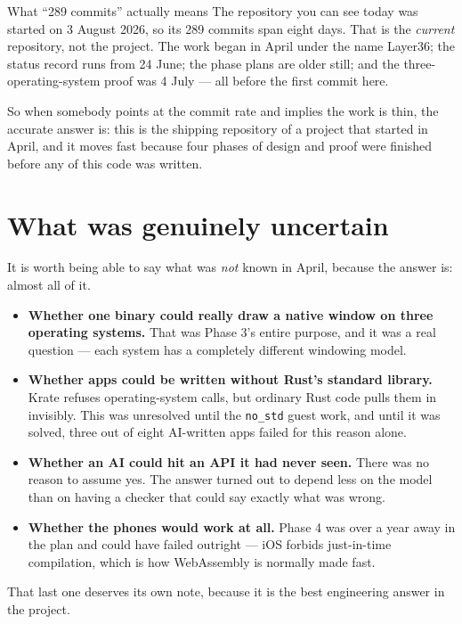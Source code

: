 \documentclass[11pt,a4paper]{report}
\begin{document}
\begin{plainbox}{What ``289 commits'' actually means}
The repository you can see today was started on 3 August 2026, so its
289 commits span eight days. That is the \emph{current} repository, not the
project. The work began in April under the name Layer36; the status record
runs from 24 June; the phase plans are older still; and the
three-operating-system proof was 4 July --- all before the first commit
here.

So when somebody points at the commit rate and implies the work is thin,
the accurate answer is: this is the shipping repository of a project that
started in April, and it moves fast because four phases of design and
proof were finished before any of this code was written.
\end{plainbox}

\section{What was genuinely uncertain}

It is worth being able to say what was \emph{not} known in April, because
the answer is: almost all of it.

\begin{itemize}[leftmargin=*]
  \item \textbf{Whether one binary could really draw a native window on
    three operating systems.} That was Phase 3's entire purpose, and it was
    a real question --- each system has a completely different windowing
    model.
  \item \textbf{Whether apps could be written without Rust's standard
    library.} Krate refuses operating-system calls, but ordinary Rust code
    pulls them in invisibly. This was unresolved until the \texttt{no\_std}
    guest work, and until it was solved, three out of eight AI-written apps
    failed for this reason alone.
  \item \textbf{Whether an AI could hit an API it had never seen.} There was
    no reason to assume yes. The answer turned out to depend less on the
    model than on having a checker that could say exactly what was wrong.
  \item \textbf{Whether the phones would work at all.} Phase 4 was over a
    year away in the plan and could have failed outright --- iOS forbids
    just-in-time compilation, which is how WebAssembly is normally made
    fast.
\end{itemize}

That last one deserves its own note, because it is the best engineering
answer in the project.
\end{document}
